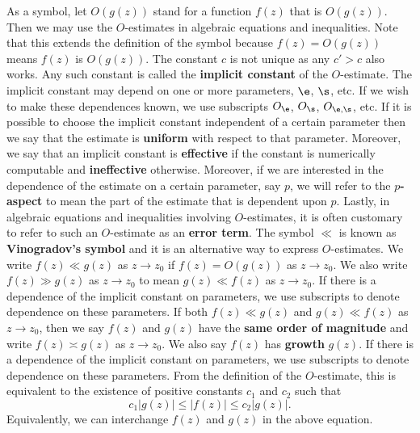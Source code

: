         As a symbol, let $O(g(z))$ stand for a function $f(z)$ that is $O(g(z))$. Then we may use the $O$-estimates in algebraic equations and inequalities. Note that this extends the definition of the symbol because $f(z) = O(g(z))$ means $f(z)$ is $O(g(z))$. The constant $c$ is not unique as any $c' > c$ also works. Any such constant is called the \textbf{implicit constant} of the $O$-estimate. The implicit constant may depend on one or more parameters, $\e$, $\s$, etc. If we wish to make these dependences known, we use subscripts $O_{\e}$, $O_{\s}$, $O_{\e,\s}$, etc. If it is possible to choose the implicit constant independent of a certain parameter then we say that the estimate is \textbf{uniform} with respect to that parameter. Moreover, we say that an implicit constant is \textbf{effective} if the constant is numerically computable and \textbf{ineffective} otherwise. Moreover, if we are interested in the dependence of the estimate on a certain parameter, say $p$, we will refer to the \textbf{$p$-aspect} to mean the part of the estimate that is dependent upon $p$. Lastly, in algebraic equations and inequalities involving $O$-estimates, it is often customary to refer to such an $O$-estimate as an \textbf{error term}. The symbol $\ll$ is known as \textbf{Vinogradov's symbol} and it is an alternative way to express $O$-estimates. We write $f(z) \ll g(z)$ as $z \to z_{0}$ if $f(z) = O(g(z))$ as $z \to z_{0}$. We also write $f(z) \gg g(z)$ as $z \to z_{0}$ to mean $g(z) \ll f(z)$ as $z \to z_{0}$. If there is a dependence of the implicit constant on parameters, we use subscripts to denote dependence on these parameters. If both $f(z) \ll g(z)$ and $g(z) \ll f(z)$ as $z \to z_{0}$, then we say $f(z)$ and $g(z)$ have the \textbf{same order of magnitude} and write $f(z) \asymp g(z)$ as $z \to z_{0}$. We also say $f(z)$ has \textbf{growth} $g(z)$. If there is a dependence of the implicit constant on parameters, we use subscripts to denote dependence on these parameters. From the definition of the $O$-estimate, this is equivalent to the existence of positive constants $c_{1}$ and $c_{2}$ such that
        \[
          c_{1}|g(z)| \le |f(z)| \le c_{2}|g(z)|.
        \]
        Equivalently, we can interchange $f(z)$ and $g(z)$ in the above equation.
